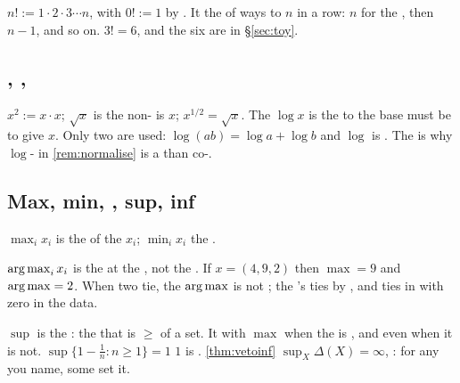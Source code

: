 \begin{definition}[Factorial]
$n! := 1\cdot 2\cdot 3 \cdots n$, with $0!:=1$ by . It  the 
of ways to  $n$   in a row: $n$  for the , then
$n-1$, and so on. $3!=6$, and the six  are   in
§\ref{sec:toy}.
\end{definition}

\subsection{, , }

$x^2 := x\cdot x$; $\sqrt{x}$ is the non-    is $x$;
$x^{1/2}=\sqrt x$. The \emph{} $\log x$ is the  to  the base
must be  to give $x$. Only two  are used:
$\log(ab)=\log a+\log b$ and $\log$ is  . The  is why
 $\log$-  in \cref{rem:normalise} is a 
 \emph{}  than  co-.

\subsection{Max, min, , sup, inf}

$\max_i x_i$ is the  of the $x_i$; $\min_i x_i$ the .

\begin{definition}[argmax]
$\operatorname*{arg\,max}_{i} x_i$ is the \emph{} at  the  , not the .
If $x=(4,9,2)$ then $\max = 9$ and $\operatorname*{arg\,max} = 2$. When two  tie, the
$\operatorname*{arg\,max}$ is not ; the 's    ties by  , and
 ties in    with  zero in the data.
\end{definition}

\begin{definition}[Supremum]
$\sup$ is the   : the   that is $\ge$  
of a set. It  with $\max$ when the  is , and  even
when it is not. $\sup\{1-\tfrac1n : n\ge1\}=1$  $1$ is  .
\cref{thm:vetoinf}  $\sup_X \Delta(X)=\infty$, : for any  you
name, some  set  it.
\end{definition}

